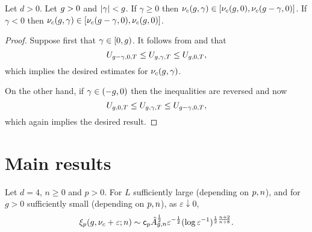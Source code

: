 \begin{lemma}
\label{lem:nuc}
Let $d >0$.
Let $g>0$ and $|\gamma| < g$.
If $\gamma \ge 0$ then $\nu_c(g, \gamma) \in [\nu_c(g, 0),\nu_c(g-\gamma, 0)]$.
If $\gamma < 0$ then $\nu_c(g,\gamma) \in [\nu_c(g-\gamma,0),\nu_c(g,0)]$.
\end{lemma}

\begin{proof}
Suppose first that $\gamma \in [0,g)$.
It follows from  and  that
\begin{equation}
    U_{g-\gamma,0,T} \le U_{g,\gamma,T} \le  U_{g,0,T},
\end{equation}
which implies the desired estimates for $\nu_c(g,\gamma)$.

On the other hand,
if $\gamma \in (-g, 0)$ then the inequalities are reversed and now
\begin{equation}
    U_{g,0,T} \le U_{g,\gamma,T} \le  U_{g-\gamma,0,T},
\end{equation}
which again implies the desired result.
\end{proof}


\section{Main results}

\begin{theorem}\label{thm:mr}
Let $d=4$, $n \geq 0$ and $p>0$.
For $L$ sufficiently large (depending on $p,n$), and for
$g >0$ sufficiently small (depending on $p,n$),
as $\varepsilon \downarrow 0$,
\begin{equation}
\lbeq{xipasy}
\xi_\clo(g, \nu_c  + \varepsilon;n)
\sim {\sf c}_p \tilde A_{g,n}^{\frac12}  \varepsilon^{-\frac{1}{2}} (\log \varepsilon^{-1})^{\frac{1}{2}\frac{n+2}{n+8}}
.
\end{equation}
\end{theorem}

